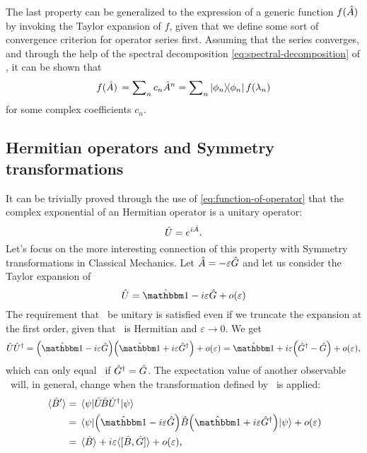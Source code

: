             The last property can be generalized to the expression of a generic function $f\pqty*{\hA}$ by invoking the Taylor expansion of $f$, given that we define some sort of convergence criterion for operator series first. Assuming that the series converges, and through the help of the spectral decomposition \eqref{eq:spectral-decomposition} of \hA, it can be shown that
            \begin{equation}
                \label{eq:function-of-operator}
                f\pqty*{\hA} = \sum\nolimits_n c_n \hA^n = \sum\nolimits_n \dyad{\phi_n}{\phi_n} f\pqty{\lambda_n}
            \end{equation}
            for some complex coefficients $c_n$.
        \subsection{Hermitian operators and Symmetry transformations}\label{ss:unitary-transformations}
            It can be trivially proved \cite{Bernardini1993-iy} through the use of \eqref{eq:function-of-operator} that the complex exponential of an Hermitian operator is a unitary operator:
            \begin{equation*}
                \hat{U} = e^{i\hat{A}}
                \text{.}
            \end{equation*}
            Let's focus on the more interesting connection of this property with Symmetry transformations in Classical Mechanics. Let $\hat{A} = -\varepsilon\hat{G}$ and let us consider the Taylor expansion of \hU
            \begin{equation*}
                \hU = \hidM - i\varepsilon\hG + o\pqty{\varepsilon}
            \end{equation*}
            The requirement that \hU\ be unitary is satisfied even if we truncate the expansion at the first order, given that \hG\ is Hermitian and $\varepsilon \to 0$. We get
            \begin{equation*}
                \hU\hU^\dag = \pqty{\hidM - i\varepsilon\hG}\pqty{\hidM + i\varepsilon\hG^\dag} + o\pqty{\varepsilon} = \hidM + i\varepsilon\pqty{\hG^\dag - \hG} + o\pqty{\varepsilon}
                \mycomma
            \end{equation*}
            which can only equal \hidM\ if $\hat{G}^\dag = \hat{G}$. The expectation value of another observable \hB\ will, in general, change when the transformation defined by \hU\ is applied:
            \begin{align*}
                \expval*{\hB'} &= \mel{\psi}{\hU\!\hB\hU^\dag}{\psi} \\
                &= \mel{\psi}{\pqty{\hidM - i\varepsilon\hG} \hB \pqty{\hidM + i\varepsilon\hG^\dag}}{\psi} + o\pqty{\varepsilon} \\
                &= \expval*{\hB} + i\varepsilon\!\expval*{\comm*{\hB}{\hG}\!} + o\pqty{\varepsilon}
                \mycomma
            \end{align*}
